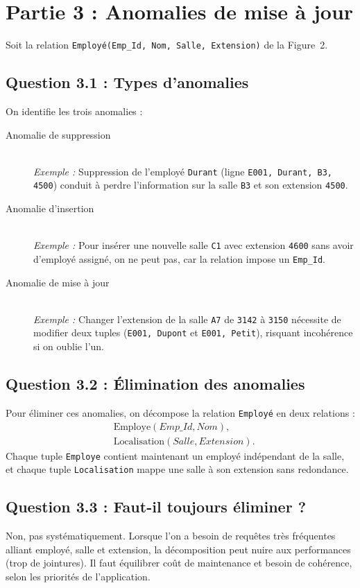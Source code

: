 \documentclass[11pt]{article}
\begin{document}
\section*{Partie 3 : Anomalies de mise à jour}
Soit la relation \texttt{Employé(Emp\_Id, Nom, Salle, Extension)} de la Figure~2.

\subsection*{Question 3.1 : Types d'anomalies}
On identifie les trois anomalies :
\begin{description}
  \item[Anomalie de suppression] \hfill\\
    \textit{Exemple :} Suppression de l'employé \texttt{Durant} (ligne \texttt{E001, Durant, B3, 4500}) conduit à perdre l'information sur la salle \texttt{B3} et son extension \texttt{4500}.\\

  \item[Anomalie d'insertion] \hfill\\
    \textit{Exemple :} Pour insérer une nouvelle salle \texttt{C1} avec extension \texttt{4600} sans avoir d'employé assigné, on ne peut pas, car la relation impose un \texttt{Emp\_Id}.\\

  \item[Anomalie de mise à jour] \hfill\\
    \textit{Exemple :} Changer l'extension de la salle \texttt{A7} de \texttt{3142} à \texttt{3150} nécessite de modifier deux tuples (\texttt{E001, Dupont} et \texttt{E001, Petit}), risquant incohérence si on oublie l'un.
\end{description}

\subsection*{Question 3.2 : Élimination des anomalies}
Pour éliminer ces anomalies, on décompose la relation \texttt{Employé} en deux relations :
\[
\begin{aligned}
& \text{Employe}(Emp\_Id, Nom),\\
& \text{Localisation}(Salle, Extension).
\end{aligned}
\]
Chaque tuple \texttt{Employe} contient maintenant un employé indépendant de la salle,
et chaque tuple \texttt{Localisation} mappe une salle à son extension sans redondance.

\subsection*{Question 3.3 : Faut-il toujours éliminer ?}
Non, pas systématiquement. Lorsque l'on a besoin de requêtes très fréquentes alliant
employé, salle et extension, la décomposition peut nuire aux performances (trop de jointures).
Il faut équilibrer coût de maintenance et besoin de cohérence, selon les priorités de l'application.
\end{document}
